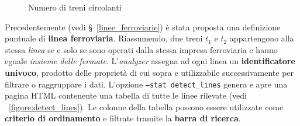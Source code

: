\documentclass[12pt,a4paper,italian]{report}
\begin{document}
\begin{figure}[p] \centering
     \vspace{5mm}
    \caption{Numero di treni circolanti}
\end{figure}

Precedentemente (vedi \S~\ref{linee_ferroviarie}) è stata proposta una
definizione puntuale di \textbf{linea ferroviaria}.  Riassumendo, due
treni $t_1$ e $t_2$ appartengono alla stessa \textit{linea} se e solo
se sono operati dalla stessa impresa ferroviaria e hanno eguale
\textit{insieme delle fermate}.  L'\textit{analyzer} assegna ad ogni
linea un \textbf{identificatore univoco}, prodotto delle proprietà di
cui sopra e utilizzabile successivamente per filtrare o raggruppare i
dati.  L'opzione \texttt{--stat detect\_\-lines} genera e apre una
pagina HTML contenente una tabella di tutte le linee rilevate (vedi
\figurename~\ref{figure:detect_lines}).  Le colonne della tabella
possono essere utilizzate come \textbf{criterio di ordinamento} e
filtrate tramite la \textbf{barra di ricerca}.
\end{document}
